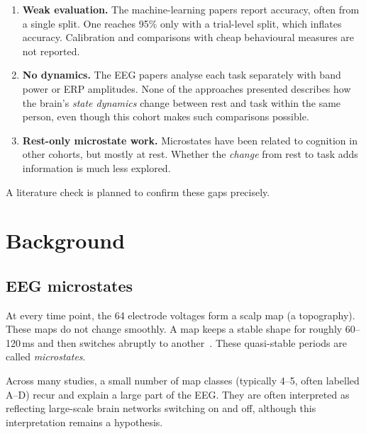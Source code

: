 \documentclass[11pt,a4paper]{article}
\begin{document}
\begin{enumerate}
  \item \textbf{Weak evaluation.} The machine-learning papers report accuracy, often from a single split. One reaches 95\% only with a trial-level split, which inflates accuracy. Calibration and comparisons with cheap behavioural measures are not reported.
  \item \textbf{No dynamics.} The EEG papers analyse each task separately with band power or ERP amplitudes. None of the approaches presented describes how the brain's \emph{state dynamics} change between rest and task within the same person, even though this cohort makes such comparisons possible.
  \item \textbf{Rest-only microstate work.} Microstates have been related to cognition in other cohorts, but mostly at rest. Whether the \emph{change} from rest to task adds information is much less explored.
\end{enumerate}

\noindent A literature check is planned to confirm these gaps precisely.

\section{Background}

\subsection{EEG microstates}

At every time point, the 64 electrode voltages form a scalp map (a topography). These maps do not change smoothly. A map keeps a stable shape for roughly 60--120\,ms and then switches abruptly to another~\cite{michel2018}. These quasi-stable periods are called \emph{microstates}.

Across many studies, a small number of map classes (typically 4--5, often labelled A--D) recur and explain a large part of the EEG. They are often interpreted as reflecting large-scale brain networks switching on and off, although this interpretation remains a hypothesis.
\end{document}
